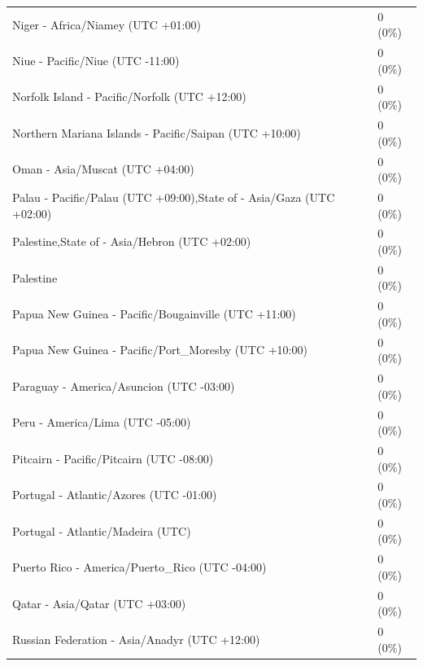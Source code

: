 \documentclass[
  english,
  man]{apa6}
\begin{document}
\begin{appendix}
\begin{table}
{\begin{tabular}[t]{ll}
\addlinespace
\hspace{1em}Niger - Africa/Niamey (UTC +01:00) & 0 (0\%)\\
\hspace{1em}Niue - Pacific/Niue (UTC -11:00) & 0 (0\%)\\
\hspace{1em}Norfolk Island - Pacific/Norfolk (UTC +12:00) & 0 (0\%)\\
\hspace{1em}Northern Mariana Islands - Pacific/Saipan (UTC +10:00) & 0 (0\%)\\
\hspace{1em}Oman - Asia/Muscat (UTC +04:00) & 0 (0\%)\\
\addlinespace
\hspace{1em}Palau - Pacific/Palau (UTC +09:00),State of - Asia/Gaza (UTC +02:00) & 0 (0\%)\\
\hspace{1em}Palestine,State of - Asia/Hebron (UTC +02:00) & 0 (0\%)\\
\hspace{1em}Palestine & 0 (0\%)\\
\hspace{1em}Papua New Guinea - Pacific/Bougainville (UTC +11:00) & 0 (0\%)\\
\hspace{1em}Papua New Guinea - Pacific/Port\_Moresby (UTC +10:00) & 0 (0\%)\\
\addlinespace
\hspace{1em}Paraguay - America/Asuncion (UTC -03:00) & 0 (0\%)\\
\hspace{1em}Peru - America/Lima (UTC -05:00) & 0 (0\%)\\
\hspace{1em}Pitcairn - Pacific/Pitcairn (UTC -08:00) & 0 (0\%)\\
\hspace{1em}Portugal - Atlantic/Azores (UTC -01:00) & 0 (0\%)\\
\hspace{1em}Portugal - Atlantic/Madeira (UTC) & 0 (0\%)\\
\addlinespace
\hspace{1em}Puerto Rico - America/Puerto\_Rico (UTC -04:00) & 0 (0\%)\\
\hspace{1em}Qatar - Asia/Qatar (UTC +03:00) & 0 (0\%)\\
\hspace{1em}Russian Federation - Asia/Anadyr (UTC +12:00) & 0 (0\%)\\

\end{tabular}}
\end{table}
\end{appendix}
\end{document}
